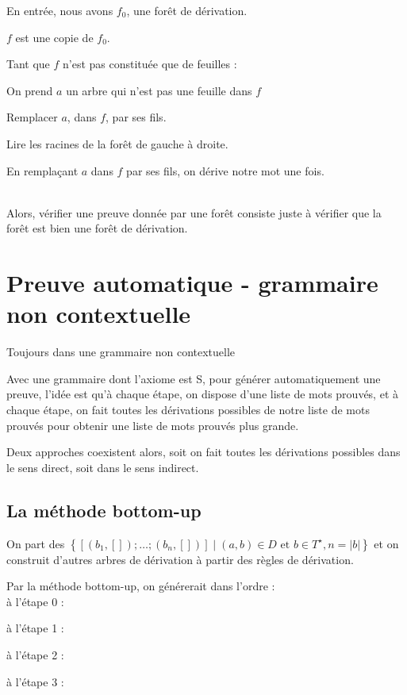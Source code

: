 \documentclass[a4paper,12pt]{article}
\newcommand{\norm}[1]{\lvert #1 \rvert}
\newlength{\mydepth}
\newlength{\myheight}
\newenvironment{answer}
{\par\begin{lrbox}{\mybox}\quad\begin{minipage}{\linewidth}\color{black}\setlength{\parskip}{10pt plus 1pt minus 1pt}\vspace*{-.7\baselineskip}}
{\end{minipage}\end{lrbox}
\settodepth{\mydepth}{\usebox{\mybox}}
\settoheight{\myheight}{\usebox{\mybox}}
\addtolength{\myheight}{\mydepth}
\noindent\makebox[0pt]{
  \color{gray}\hspace{-0pt}\rule[-\mydepth]{1pt}{\myheight}}
  \usebox{\mybox}
  }
\begin{document}
En entrée, nous avons $f_0$, une forêt de dérivation.
\begin{answer} 
$f$ est une copie de $f_0$. 

Tant que $f$ n'est pas constituée que de feuilles :

\begin{answer} 
    On prend $a$ un arbre qui n'est pas une feuille dans $f$

    Remplacer $a$, dans $f$, par ses fils.

    Lire les racines de la forêt de gauche à droite.
\end{answer}
\end{answer}
En remplaçant $a$ dans $f$ par ses fils, on dérive notre mot une fois.\\\\


Alors, vérifier une preuve donnée par une forêt consiste juste à vérifier que la forêt est bien une forêt de dérivation.

\section{Preuve automatique - grammaire non contextuelle}

Toujours dans une grammaire non contextuelle

Avec une grammaire dont l'axiome est S,
pour générer automatiquement une preuve, l'idée est qu'à chaque étape,
on dispose d'une liste de mots prouvés,
et à chaque étape, on fait toutes les dérivations possibles de notre liste de mots prouvés pour obtenir une liste de mots prouvés plus grande.

Deux approches coexistent alors, soit on fait toutes les dérivations possibles dans le sens direct, soit dans le sens indirect.

\subsection{La méthode bottom-up}

On part des $\left\{ [(b_1,[]);\dots;(b_n,[])] \mid (a,b)\in D \text{ et } b \in T^\star , n = \norm{b}\right\}$ et on construit d'autres arbres de dérivation à partir des règles de dérivation.

Par la méthode bottom-up, on générerait dans l'ordre :\\
à l'étape 0 :
 
à l'étape 1 : 
 
à l'étape 2 : 
 
à l'étape 3 : 
 
\end{document}
